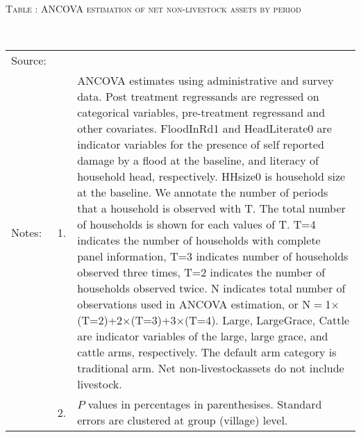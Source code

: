 \hspace{-1cm}\begin{minipage}[t]{14cm}
\hfil\textsc{\normalsize Table \thetable: ANCOVA estimation of net non-livestock assets by period\label{tab ANCOVA NetNLAssets timevarying}}\\
\setlength{\tabcolsep}{1pt}
\setlength{\baselineskip}{8pt}
\renewcommand{\arraystretch}{.55}
\hfil{}\\
\renewcommand{\arraystretch}{.8}
\setlength{\tabcolsep}{1pt}
\begin{tabular}{>{\hfill\scriptsize}p{1cm}<{}>{\hfill\scriptsize}p{.25cm}<{}>{\scriptsize}p{12cm}<{\hfill}}
Source:& \multicolumn{2}{l}{\scriptsize Estimated with GUK administrative and survey data.}\\
Notes: & 1. & ANCOVA estimates using administrative and survey data. Post treatment regressands are regressed on categorical variables, pre-treatment regressand and other covariates. \textsf{FloodInRd1} and \textsf{HeadLiterate0} are indicator variables for the presence of self reported damage by a flood at the baseline, and literacy of household head, respectively. \textsf{HHsize0} is household size at the baseline. We annotate the number of periods that a household is observed with \textsf{T}. The total number of households is shown for each values of \textsf{T}. \textsf{T=4} indicates the number of households with complete panel information, \textsf{T=3} indicates number of households observed three times, \textsf{T=2} indicates the number of households observed twice. \textsf{N} indicates total number of observations used in ANCOVA estimation, or \textsf{N$=$1$\times$(T=2)+2$\times$(T=3)+3$\times$(T=4)}.  \textsf{Large}, \textsf{LargeGrace}, \textsf{Cattle} are indicator variables of the \textsf{large}, \textsf{large grace}, and \textsf{cattle} arms, respectively. The default arm category is \textsf{traditional} arm. Net non-livestockassets do not include livestock. \\
& 2. & $P$ values in percentages in parenthesises. Standard errors are clustered at group (village) level.
\end{tabular}
\end{minipage}

